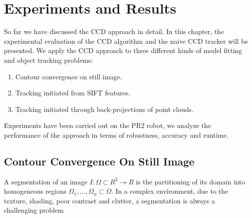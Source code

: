 \chapter{Experiments and Results}
\label{chapter:experiments}

So far we have discussed the CCD approach in detail. In this chapter,
the experimental evaluation of the CCD algorithm and the naive CCD
tracker will be presented. We apply the CCD approach to three
different kinds of model fitting and object tracking problems:

\begin{enumerate}
\item Contour convergence on still image.
\item Tracking initiated from SIFT features.
\item Tracking initiated through back-projections of point clouds.
\end{enumerate}

Experiments have been carried out on the PR2 robot, we analyze the performance
of the approach in terms of robustness, accuracy and runtime. %



\section{Contour Convergence On Still Image}
\label{sec:ES}


A segmentation of an image $I: \Omega \subset R^2 \longrightarrow R$
is the partitioning of its domain into homogeneous regions
$\Omega_1,\ldots, \Omega_n \subset \Omega$. In a complex environment,
due to the texture, shading, poor contrast and clutter, a segmentation is
always a challenging problem %


